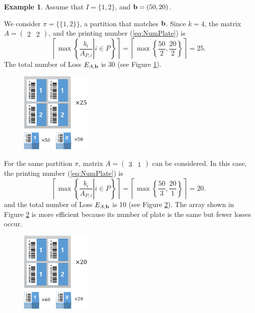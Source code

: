 \documentclass[a4paper]{amsart}
\numberwithin{equation}{section} %
\numberwithin{figure}{section} %
\numberwithin{table}{section}
\theoremstyle{plain}
\theoremstyle{definition}
\newtheorem{example}[thm]{Example}
\theoremstyle{plain}
\theoremstyle{plain}
\theoremstyle{plain}
\theoremstyle{plain}
\theoremstyle{plain}
\begin{document}
\begin{example}
	Assume that $I=\{1,2\}$, and ${\bf b}=(50,20)$.
	
	We consider $\pi = \{\{1,2\}\}$, a partition that matches ${\bf b}$. Since $k = 4$, 
	the matrix $A = (\begin{array}{cc}2 & 2\end{array})$, and the printing number (\ref{eq:NumPlate}) is 
	\begin{equation}
	\left\lceil \max\left\{ \left. \frac{b_{i}}{A_{P,i}} \right| i \in P \right\} \right\rceil = \left\lceil \max \left\{ \frac{50}{2}, \frac{20}{2} \right\} \right\rceil = 25.
	\end{equation}
	The total number of Loss $E_{A,{\bf b}}$ is 30 (see Figure \ref{fig:ex21}).
	
	\begin{figure}[h!]
		\centering
		\includegraphics[width=3.5cm]{ex21.pdf}
		\caption{}
		\label{fig:ex21}       %
	\end{figure}
	
	For the same partition $\pi$, matrix $A = (\begin{array}{cc}3 & 1\end{array})$ can be considered. In this case, the printing number (\ref{eq:NumPlate}) is 
	\begin{equation}
	\left\lceil \max\left\{ \left. \frac{b_{i}}{A_{P,i}} \right| i \in P \right\} \right\rceil = \left\lceil \max \left\{ \frac{50}{3}, \frac{20}{1} \right\} \right\rceil = 20.
	\end{equation}
	and the total number of Loss $E_{A,{\bf b}}$ is 10 (see Figure \ref{fig:ex22}).
	The array shown in Figure \ref{fig:ex22} is more efficient because its number of plate is the same but fewer losses occur.
	\begin{figure}[h!]
		\centering
		\includegraphics[width=3.5cm]{ex22.pdf}
		\caption{}
		\label{fig:ex22}       %
	\end{figure}
\end{example}
\end{document}
